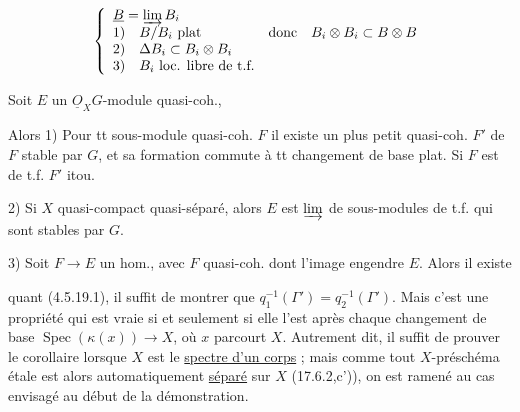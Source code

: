 
\[
\left\{\begin{array}{ll}
\underline B=\varinjlim B_i &\\
1)\quad B/B_i\text{ plat} & \text{donc}\quad B_i\otimes B_i\subset B\otimes B\\
2)\quad \Delta B_i\subset B_i\otimes B_i &\\
3)\quad B_i\text{ loc. libre de t.f.} &
\end{array}\right.
\]

Soit $E$ un $\underline O_X G$-module quasi-coh., 

Alors 1) Pour tt sous-module quasi-coh. $F$ il existe un plus petit  quasi-coh. $F'$ de $F$  stable par $G$, et sa formation commute à tt changement de base plat. Si $F$ est de t.f. $F'$ itou.

2) Si $X$ quasi-compact quasi-séparé, alors $E$ est $\varinjlim$ de sous-modules  de t.f. qui sont stables par $G$.


3) Soit $F\to E$ un hom., avec $F$ quasi-coh.  dont l'image engendre $E$. Alors il existe


quant (4.5.19.1), il suffit de montrer que $q_1^{-1}(\Gamma')=q_2^{-1}(\Gamma')$. Mais c'est une propriété  qui est vraie si  et seulement si elle l'est après chaque changement de base $\operatorname{Spec}(\kappa(x))\to X$, où $x$ parcourt $X$. Autrement dit, il suffit de prouver le corollaire lorsque $X$ est le \uline{spectre d'un corps} ; mais comme tout $X$-préschéma étale est alors automatiquement \uline{séparé} sur $X$ (17.6.2,c')), on est ramené au cas envisagé au début de la démonstration.



